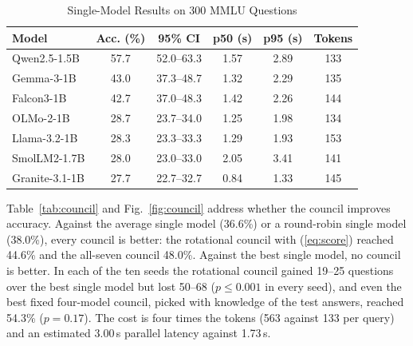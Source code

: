 \begin{table}[t]
\caption{Single-Model Results on 300 MMLU Questions}
\label{tab:models}
\centering
\footnotesize
\setlength{\tabcolsep}{3.5pt}
\begin{tabular}{@{}lccccc@{}}
\toprule
Model & Acc. (\%) & 95\% CI & p50 (s) & p95 (s) & Tokens \\
\midrule
Qwen2.5-1.5B & 57.7 & 52.0--63.3 & 1.57 & 2.89 & 133 \\
Gemma-3-1B & 43.0 & 37.3--48.7 & 1.32 & 2.29 & 135 \\
Falcon3-1B & 42.7 & 37.0--48.3 & 1.42 & 2.26 & 144 \\
OLMo-2-1B & 28.7 & 23.7--34.0 & 1.25 & 1.98 & 134 \\
Llama-3.2-1B & 28.3 & 23.3--33.3 & 1.29 & 1.93 & 153 \\
SmolLM2-1.7B & 28.0 & 23.0--33.0 & 2.05 & 3.41 & 141 \\
Granite-3.1-1B & 27.7 & 22.7--32.7 & 0.84 & 1.33 & 145 \\
\bottomrule
\end{tabular}
\end{table}

Table~\ref{tab:council} and Fig.~\ref{fig:council} address whether the council improves accuracy. Against the average single model (36.6\%) or a round-robin single model (38.0\%), every council is better: the rotational council with (\ref{eq:score}) reached 44.6\% and the all-seven council 48.0\%. Against the best single model, no council is better. In each of the ten seeds the rotational council gained 19--25 questions over the best single model but lost 50--68 ($p\le0.001$ in every seed), and even the best fixed four-model council, picked with knowledge of the test answers, reached 54.3\% ($p=0.17$). The cost is four times the tokens (563 against 133 per query) and an estimated 3.00\,s parallel latency against 1.73\,s.

